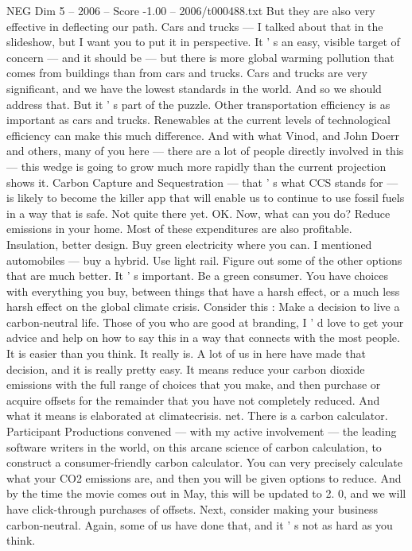 \begin{textsample}{NEG Dim 5 – 2006 – Score -1.00 – 2006/t000488.txt}
But they are also very effective in deflecting our path.
Cars and trucks — I talked about that in the slideshow, but I want you to put it in perspective.
It ' s an easy, visible target of concern — and it should be — but there is more global warming pollution that comes from buildings than from cars and trucks.
Cars and trucks are very significant, and we have the lowest standards in the world.
And so we should address that.
But it ' s part of the puzzle.
Other transportation efficiency is as important as cars and trucks.
Renewables at the current levels of technological efficiency can make this much difference.
And with what Vinod, and John Doerr and others, many of you here — there are a lot of people directly involved in this — this wedge is going to grow much more rapidly than the current projection shows it.
Carbon Capture and Sequestration — that ' s what CCS stands for — is likely to become the killer app that will enable us to continue to use fossil fuels in a way that is safe.
Not quite there yet.
OK.
Now, what can you do?
Reduce emissions in your home.
Most of these expenditures are also profitable.
Insulation, better design.
Buy green electricity where you can.
I mentioned automobiles — buy a hybrid.
Use light rail.
Figure out some of the other options that are much better.
It ' s important.
Be a green consumer.
You have choices with everything you buy, between things that have a harsh effect, or a much less harsh effect on the global climate crisis.
Consider this : Make a decision to live a carbon-neutral life.
Those of you who are good at branding, I ' d love to get your advice and help on how to say this in a way that connects with the most people.
It is easier than you think.
It really is.
A lot of us in here have made that decision, and it is really pretty easy.
It means reduce your carbon dioxide emissions with the full range of choices that you make, and then purchase or acquire offsets for the remainder that you have not completely reduced.
And what it means is elaborated at climatecrisis. net.
There is a carbon calculator.
Participant Productions convened — with my active involvement — the leading software writers in the world, on this arcane science of carbon calculation, to construct a consumer-friendly carbon calculator.
You can very precisely calculate what your CO2 emissions are, and then you will be given options to reduce.
And by the time the movie comes out in May, this will be updated to 2. 0, and we will have click-through purchases of offsets.
Next, consider making your business carbon-neutral.
Again, some of us have done that, and it ' s not as hard as you think.

\end{textsample}
